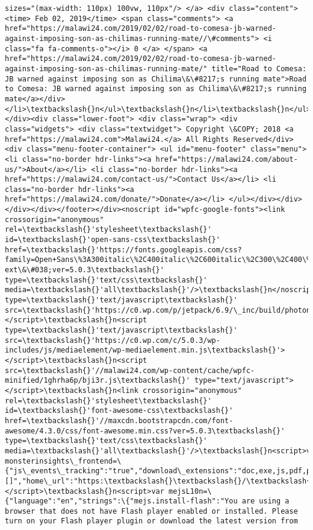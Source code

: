 \documentclass[11pt]{article}
\begin{document}
\begin{Verbatim}[commandchars=\\\{\}]
sizes="(max-width: 110px) 100vw, 110px"/> </a> <div class="content"> <time> Feb 02, 2019</time> <span class="comments"> <a href="https://malawi24.com/2019/02/02/road-to-comesa-jb-warned-against-imposing-son-as-chilimas-running-mate//\#comments"> <i class="fa fa-comments-o"></i> 0 </a> </span> <a href="https://malawi24.com/2019/02/02/road-to-comesa-jb-warned-against-imposing-son-as-chilimas-running-mate/" title="Road to Comesa: JB warned against imposing son as Chilima\&\#8217;s running mate">Road to Comesa: JB warned against imposing son as Chilima\&\#8217;s running mate</a></div></li>\textbackslash{}n</ul>\textbackslash{}n</li>\textbackslash{}n</ul></div><div class="lower-foot"> <div class="wrap"> <div class="widgets"> <div class="textwidget"> Copyright \&COPY; 2018 <a href="https://malawi24.com">Malawi24.</a> All Rights Reserved</div><div class="menu-footer-container"> <ul id="menu-footer" class="menu"> <li class="no-border hdr-links"><a href="https://malawi24.com/about-us/">About</a></li> <li class="no-border hdr-links"><a href="https://malawi24.com/contact-us/">Contact Us</a></li> <li class="no-border hdr-links"><a href="https://malawi24.com/donate/">Donate</a></li> </ul></div></div></div></div></footer></div><noscript id="wpfc-google-fonts"><link crossorigin="anonymous" rel=\textbackslash{}'stylesheet\textbackslash{}' id=\textbackslash{}'open-sans-css\textbackslash{}' href=\textbackslash{}'https://fonts.googleapis.com/css?family=Open+Sans\%3A300italic\%2C400italic\%2C600italic\%2C300\%2C400\%2C600\&\#038;subset=latin\%2Clatin-ext\&\#038;ver=5.0.3\textbackslash{}' type=\textbackslash{}'text/css\textbackslash{}' media=\textbackslash{}'all\textbackslash{}'/>\textbackslash{}n</noscript>\textbackslash{}n<script type=\textbackslash{}'text/javascript\textbackslash{}' src=\textbackslash{}'https://c0.wp.com/p/jetpack/6.9/\_inc/build/photon/photon.min.js\textbackslash{}'></script>\textbackslash{}n<script type=\textbackslash{}'text/javascript\textbackslash{}' src=\textbackslash{}'https://c0.wp.com/c/5.0.3/wp-includes/js/mediaelement/wp-mediaelement.min.js\textbackslash{}'></script>\textbackslash{}n<script src=\textbackslash{}'//malawi24.com/wp-content/cache/wpfc-minified/1ghrha6p/bji3r.js\textbackslash{}' type="text/javascript"></script>\textbackslash{}n<link crossorigin="anonymous" rel=\textbackslash{}'stylesheet\textbackslash{}' id=\textbackslash{}'font-awesome-css\textbackslash{}' href=\textbackslash{}'//maxcdn.bootstrapcdn.com/font-awesome/4.3.0/css/font-awesome.min.css?ver=5.0.3\textbackslash{}' type=\textbackslash{}'text/css\textbackslash{}' media=\textbackslash{}'all\textbackslash{}'/>\textbackslash{}n<script>var monsterinsights\_frontend=\{"js\_events\_tracking":"true","download\_extensions":"doc,exe,js,pdf,ppt,tgz,zip,xls","inbound\_paths":"[]","home\_url":"https:\textbackslash{}\textbackslash{}/\textbackslash{}\textbackslash{}/malawi24.com","hash\_tracking":"false"\};</script>\textbackslash{}n<script>var mejsL10n=\{"language":"en","strings":\{"mejs.install-flash":"You are using a browser that does not have Flash player enabled or installed. Please turn on your Flash player plugin or download the latest version from 
\end{Verbatim}
\end{document}
